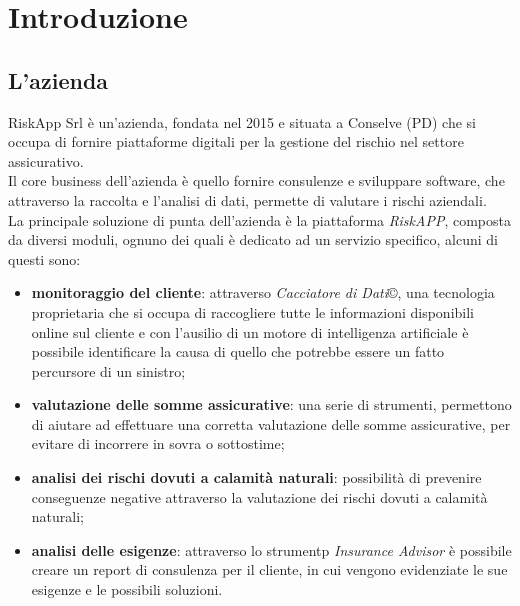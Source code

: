 \chapter{Introduzione}
\label{cap:introduzione}





\section{L'azienda}
\label{sec:azienda}

RiskApp Srl è un'azienda, fondata nel 2015 e situata a Conselve (PD) che si occupa di fornire piattaforme digitali per la gestione del rischio nel settore assicurativo.\\
\indent Il core business dell'azienda è quello fornire consulenze e sviluppare software, che attraverso la raccolta e l'analisi di dati, permette di valutare i rischi aziendali. \\
\indent La principale soluzione di punta dell'azienda è la piattaforma \emph{RiskAPP}, composta da diversi moduli, ognuno dei quali è dedicato ad un servizio specifico, alcuni di questi sono:
\begin{itemize}
    \item \textbf{monitoraggio del cliente}: attraverso \emph{Cacciatore di Dati}\copyright, una tecnologia proprietaria che si occupa di raccogliere tutte le informazioni disponibili online sul cliente e con l'ausilio di un motore di intelligenza artificiale è possibile identificare la causa di quello che potrebbe essere un fatto percursore di un sinistro;
    \item \textbf{valutazione delle somme assicurative}: una serie di strumenti, permettono di aiutare ad effettuare una corretta valutazione delle somme assicurative, per evitare di incorrere in sovra o sottostime;
    \item \textbf{analisi dei rischi dovuti a calamità naturali}: possibilità di prevenire conseguenze negative attraverso la valutazione dei rischi dovuti a calamità naturali;
    \item \textbf{analisi delle esigenze}: attraverso lo strumentp \emph{Insurance Advisor} è possibile creare un report di consulenza per il cliente, in cui vengono evidenziate le sue esigenze e le possibili soluzioni.
\end{itemize}

